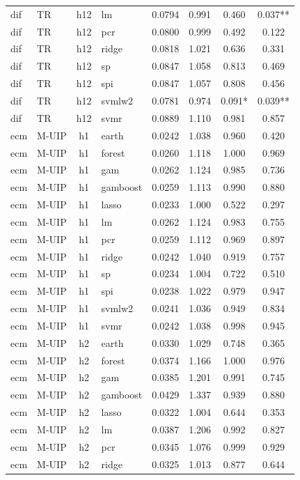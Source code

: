 \begin{ThreePartTable}
\begin{longtable}[t]{llclcccc}
dif & TR & h12 & lm & 0.0794 & 0.991 & 0.460 & 0.037**\\
dif & TR & h12 & pcr & 0.0800 & 0.999 & 0.492 & 0.122\\
dif & TR & h12 & ridge & 0.0818 & 1.021 & 0.636 & 0.331\\
dif & TR & h12 & sp & 0.0847 & 1.058 & 0.813 & 0.469\\
dif & TR & h12 & spi & 0.0847 & 1.057 & 0.808 & 0.456\\
dif & TR & h12 & svmlw2 & 0.0781 & 0.974 & 0.091* & 0.039**\\
dif & TR & h12 & svmr & 0.0889 & 1.110 & 0.981 & 0.857\\
\addlinespace
ecm & M-UIP & h1 & earth & 0.0242 & 1.038 & 0.960 & 0.420\\
ecm & M-UIP & h1 & forest & 0.0260 & 1.118 & 1.000 & 0.969\\
ecm & M-UIP & h1 & gam & 0.0262 & 1.124 & 0.985 & 0.736\\
ecm & M-UIP & h1 & gamboost & 0.0259 & 1.113 & 0.990 & 0.880\\
ecm & M-UIP & h1 & lasso & 0.0233 & 1.000 & 0.522 & 0.297\\
ecm & M-UIP & h1 & lm & 0.0262 & 1.124 & 0.983 & 0.755\\
ecm & M-UIP & h1 & pcr & 0.0259 & 1.112 & 0.969 & 0.897\\
ecm & M-UIP & h1 & ridge & 0.0242 & 1.040 & 0.919 & 0.757\\
ecm & M-UIP & h1 & sp & 0.0234 & 1.004 & 0.722 & 0.510\\
ecm & M-UIP & h1 & spi & 0.0238 & 1.022 & 0.979 & 0.947\\
ecm & M-UIP & h1 & svmlw2 & 0.0241 & 1.036 & 0.949 & 0.834\\
ecm & M-UIP & h1 & svmr & 0.0242 & 1.038 & 0.998 & 0.945\\
\addlinespace
ecm & M-UIP & h2 & earth & 0.0330 & 1.029 & 0.748 & 0.365\\
ecm & M-UIP & h2 & forest & 0.0374 & 1.166 & 1.000 & 0.976\\
ecm & M-UIP & h2 & gam & 0.0385 & 1.201 & 0.991 & 0.745\\
ecm & M-UIP & h2 & gamboost & 0.0429 & 1.337 & 0.939 & 0.880\\
ecm & M-UIP & h2 & lasso & 0.0322 & 1.004 & 0.644 & 0.353\\
ecm & M-UIP & h2 & lm & 0.0387 & 1.206 & 0.992 & 0.827\\
ecm & M-UIP & h2 & pcr & 0.0345 & 1.076 & 0.999 & 0.929\\
ecm & M-UIP & h2 & ridge & 0.0325 & 1.013 & 0.877 & 0.644\\

\end{longtable}
\end{ThreePartTable}
